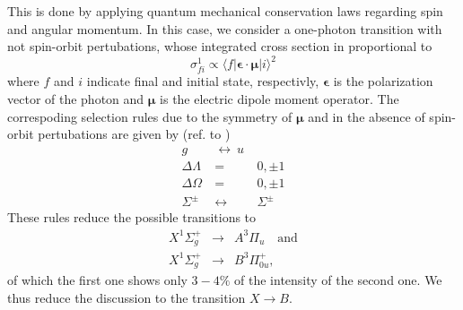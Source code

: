 This is done by applying quantum mechanical 
conservation laws regarding spin and angular momentum. In this case, 
we consider a one-photon transition with not spin-orbit pertubations, 
whose integrated cross section in proportional to
\begin{equation}
    \sigma_{fi}^1 \propto \langle f | \mathbf{\epsilon \cdot \mu} | i \rangle^2
\end{equation}
 where $f$ and $i$ indicate final and initial state, respectivly, 
$\mathbf{\epsilon}$ is the polarization vector of the photon and
$\mathbf{\mu}$ is the electric dipole moment operator. 
The correspoding selection rules due to the symmetry of $\mathbf{\mu}$ 
and in the absence of spin-orbit pertubations 
are given by (ref. to \cite{lefebvre2004spectra}) 
\begin{eqnarray}
    g  \ &\leftrightarrow \ u \\
    \Delta \Lambda \ &=&  \  0, \pm 1 \\
    \Delta \Omega \ &=& \ 0, \pm 1 \\
    \Sigma^\pm \ &\leftrightarrow& \ \Sigma^\pm
\end{eqnarray}
These rules reduce the possible transitions to 
\begin{eqnarray}
    X ^1\Sigma_g^+ &\rightarrow & A ^3\Pi_{u} \quad \mathrm{and} \\
    X ^1\Sigma_g^+ &\rightarrow & B ^3\Pi_{0u}^+, 
\end{eqnarray}
of which the first one shows only $3 - 4\%$ of the intensity of 
the second one. We thus reduce the discussion to the transition 
$X \rightarrow B$. 


